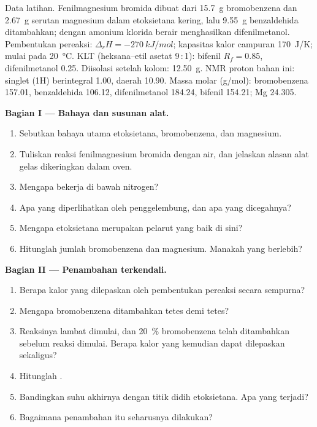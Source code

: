 \begin{problem}
\label{pb:b2:lab-techniques-2:1}
Data latihan. Fenilmagnesium bromida dibuat dari \qty{15.7}{g} bromobenzena
dan \qty{2.67}{g} serutan magnesium dalam etoksietana kering, lalu
\qty{9.55}{g} benzaldehida ditambahkan;  dengan amonium klorida
berair menghasilkan difenilmetanol. Pembentukan pereaksi: $\Delta_rH =
\qty{-270}{kJ/mol}$; kapasitas kalor campuran \qty{170}{J/K}; mulai pada
\qty{20}{\degreeCelsius}. KLT
(heksana--etil asetat 9\,:\,1): bifenil $R_f = 0.85$, difenilmetanol 0.25.
Diisolasi setelah kolom:
\qty{12.50}{g}. NMR proton bahan ini: singlet  (1H) berintegral
1.00, daerah  10.90. Massa molar (\unit{g/mol}): bromobenzena
157.01, benzaldehida 106.12, difenilmetanol
184.24, bifenil 154.21; Mg 24.305.

\medskip
\noindent\textbf{Bagian I --- Bahaya dan susunan alat.}
\begin{enumerate}
  \item Sebutkan bahaya utama etoksietana, bromobenzena, dan magnesium.
  \item Tuliskan reaksi fenilmagnesium bromida dengan air, dan jelaskan
        alasan alat gelas dikeringkan dalam oven.
  \item Mengapa bekerja di bawah nitrogen?
  \item Apa yang diperlihatkan oleh penggelembung, dan apa yang dicegahnya?
  \item Mengapa etoksietana merupakan pelarut yang baik di sini?
  \item Hitunglah jumlah bromobenzena dan magnesium. Manakah yang berlebih?
\end{enumerate}

\medskip
\noindent\textbf{Bagian II --- Penambahan terkendali.}
\begin{enumerate}[resume]
  \item Berapa kalor yang dilepaskan oleh pembentukan pereaksi secara sempurna?
  \item Mengapa bromobenzena ditambahkan tetes demi tetes?
  \item Reaksinya lambat dimulai, dan 20~\% bromobenzena telah ditambahkan
        sebelum reaksi dimulai. Berapa kalor yang kemudian dapat dilepaskan
        sekaligus?
  \item Hitunglah .
  \item Bandingkan suhu akhirnya dengan titik didih etoksietana. Apa yang terjadi?
  \item Bagaimana penambahan itu seharusnya dilakukan?
\end{enumerate}


\end{problem}
